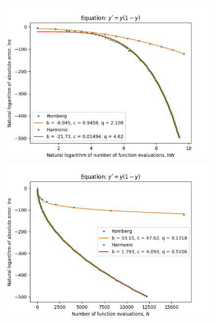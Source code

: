 \begin{figure}[H]
\centering
\begin{minipage}{0.45\textwidth}
\centering
\includegraphics[scale=0.45]{emr_plots/logistic_hp_log_log_pow_fit_trend.png}
\end{minipage}
\begin{minipage}{0.45\textwidth}
\centering
\includegraphics[scale=0.45]{emr_plots/logistic_hp_trend.png}
\end{minipage}
\end{figure}

